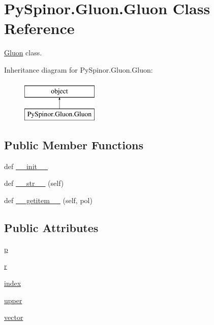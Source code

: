 \hypertarget{class_py_spinor_1_1_gluon_1_1_gluon}{}\section{Py\+Spinor.\+Gluon.\+Gluon Class Reference}
\label{class_py_spinor_1_1_gluon_1_1_gluon}


\hyperlink{class_py_spinor_1_1_gluon_1_1_gluon}{Gluon} class.  


Inheritance diagram for Py\+Spinor.\+Gluon.\+Gluon\+:\begin{figure}[H]
\begin{center}
\leavevmode
\includegraphics[height=2.000000cm]{class_py_spinor_1_1_gluon_1_1_gluon}
\end{center}
\end{figure}
\subsection*{Public Member Functions}
\begin{DoxyCompactItemize}
\item 
def \hyperlink{class_py_spinor_1_1_gluon_1_1_gluon_a57608c7c1b5c7d7bc10f3924059686be}{\+\_\+\+\_\+init\+\_\+\+\_\+}
\item 
def \hyperlink{class_py_spinor_1_1_gluon_1_1_gluon_aeee21fbdf614f791756ec5bfc25aec7c}{\+\_\+\+\_\+str\+\_\+\+\_\+} (self)
\item 
def \hyperlink{class_py_spinor_1_1_gluon_1_1_gluon_a89302eeb19dc10b7fb1ffe2a1affc678}{\+\_\+\+\_\+getitem\+\_\+\+\_\+} (self, pol)
\end{DoxyCompactItemize}
\subsection*{Public Attributes}
\begin{DoxyCompactItemize}
\item 
\hyperlink{class_py_spinor_1_1_gluon_1_1_gluon_ab6e6d38292b6b8e63ed888df78fa23ff}{p}
\item 
\hyperlink{class_py_spinor_1_1_gluon_1_1_gluon_a4cc0aee09287cfb077f59e2c6665145d}{r}
\item 
\hyperlink{class_py_spinor_1_1_gluon_1_1_gluon_a890f8133ad0546d319f9319789def113}{index}
\item 
\hyperlink{class_py_spinor_1_1_gluon_1_1_gluon_afc4fcbb98438d15efdfea2df9702c6ac}{upper}
\item 
\hyperlink{class_py_spinor_1_1_gluon_1_1_gluon_aa77d6b321ed6a1cb5dbf72bd1f6645f0}{vector}
\end{DoxyCompactItemize}


